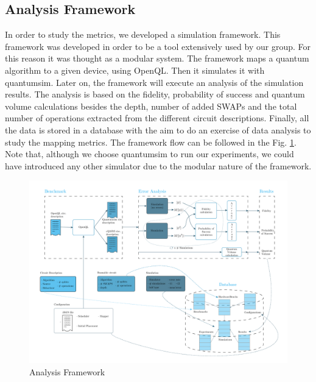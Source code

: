 \subsection*{Analysis Framework}
\label{sec:org4983c4b}
In order to study the metrics, we developed a simulation framework.
This framework was developed in order to be a tool extensively used by our group.
For this reason it was thought as a modular system.
The framework maps a quantum algorithm to a given device, using OpenQL.
Then it simulates it with quantumsim.
Later on, the framework will execute an analysis of the simulation results.
The analysis is based on the fidelity, probability of success and quantum volume calculations besides the depth, number of added SWAPs and the total number of operations extracted from the different circuit descriptions.
Finally, all the data is stored in a database with the aim to do an exercise of data analysis to study the mapping metrics.
The framework flow can be followed in the Fig. \ref{fig:general_error_framework}.
Note that, although we choose quantumsim to run our experiments, we could have introduced any other simulator due to the modular nature of the framework.



\begin{figure}

\begin{center}
\includegraphics[width=.9\linewidth]{figures/error_framework_diagram.png}
\end{center}


    \caption{Analysis Framework}
    \label{fig:general_error_framework}
\end{figure}

